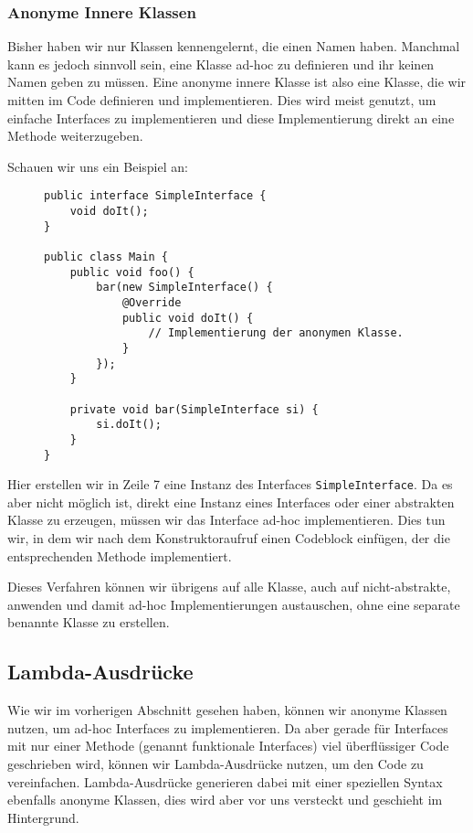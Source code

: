 	\subsubsection{Anonyme Innere Klassen}
		Bisher haben wir nur Klassen kennengelernt, die einen Namen haben. Manchmal kann es jedoch sinnvoll sein, eine Klasse ad-hoc zu definieren und ihr keinen Namen geben zu müssen. Eine anonyme innere Klasse ist also eine Klasse, die wir mitten im Code definieren und implementieren. Dies wird meist genutzt, um einfache Interfaces zu implementieren und diese Implementierung direkt an eine Methode weiterzugeben.
		
		Schauen wir uns ein Beispiel an:
		\begin{figure}[H]
			\centering
			\begin{lstlisting}
public interface SimpleInterface {
	void doIt();
}

public class Main {
	public void foo() {
		bar(new SimpleInterface() {
			@Override
			public void doIt() {
				// Implementierung der anonymen Klasse.
			}
		});
	}

	private void bar(SimpleInterface si) {
		si.doIt();
	}
}
\end{lstlisting}
		\end{figure}
		Hier erstellen wir in Zeile 7 eine Instanz des Interfaces \lstinline|SimpleInterface|. Da es aber nicht möglich ist, direkt eine Instanz eines Interfaces oder einer abstrakten Klasse zu erzeugen, müssen wir das Interface ad-hoc implementieren. Dies tun wir, in dem wir nach dem Konstruktoraufruf einen Codeblock einfügen, der die entsprechenden Methode implementiert.
		
		Dieses Verfahren können wir übrigens auf alle Klasse, auch auf nicht-abstrakte, anwenden und damit ad-hoc Implementierungen austauschen, ohne eine separate benannte Klasse zu erstellen.

\subsection{Lambda-Ausdrücke}
	\label{sec:lambda}

	Wie wir im vorherigen Abschnitt gesehen haben, können wir anonyme Klassen nutzen, um ad-hoc Interfaces zu implementieren. Da aber gerade für Interfaces mit nur einer Methode (genannt funktionale Interfaces) viel überflüssiger Code geschrieben wird, können wir Lambda-Ausdrücke nutzen, um den Code zu vereinfachen. Lambda-Ausdrücke generieren dabei mit einer speziellen Syntax ebenfalls anonyme Klassen, dies wird aber vor uns versteckt und geschieht im Hintergrund.
	
